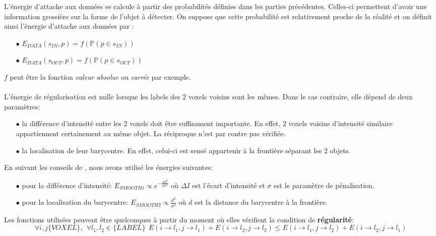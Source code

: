 \documentclass{article}
\begin{document}
L'énergie d'attache aux données se calcule à partir des probabilités définies dans les parties précédentes. Celles-ci permettent d'avoir une information grossière sur la forme de l'objet à détecter. On suppose que cette probabilité est relativement proche de la réalité et on définit ainsi l'énergie d'attache aux données par :
\begin{center}
\begin{itemize}
	\item[$\bullet$] $E_{DATA}(s_{IN}, p) = f(\mathbb{P}(p \in s_{IN}))$
	\item[$\bullet$] $E_{DATA}(s_{OUT}, p) =f( \mathbb{P}(p \in s_{OUT}))$
\end{itemize}
\end{center}
$f$ peut être la fonction \textit{valeur absolue} ou \textit{carrée} par exemple.
\\
\\
L'énergie de régularisation est nulle lorsque les labels des 2 voxels voisins sont les mêmes. Dans le cas contraire, elle dépend de deux paramètres:
\begin{itemize}
	\item[$\bullet$] la différence d'intensité entre les 2 voxels doit être suffisament importante. En effet, 2 voxels voisins d'intensité similaire appartiennent certainement au même objet. La réciproque n'est par contre pas vérifiée.
	\item[$\bullet$] la localisation de leur barycentre. En effet, celui-ci est sensé appartenir à la frontière séparant les 2 objets.
\end{itemize}
En suivant les conseils de \cite{bib:seg}, nous avons utilisé les énergies suivantes:
\begin{itemize}
	\item[$\bullet$] pour la différence d'intensité: $E_{SMOOTH 1} \varpropto e^{-\frac{\Delta I^2}{2\sigma^2}}$ où $\Delta I$ est l'écart d'intensité et $\sigma$ est le paramètre de pénalisation.
	\item[$\bullet$] pour la localisation du barycentre: $E_{SMOOTH 2} \varpropto  \frac{d^2}{\sigma^2}$ où $d$ est la distance du barycentre à la frontière.
\end{itemize}
Les fonctions utilisées peuvent être quelconques à partir du moment où elles vérifient la condition de \textbf{régularité}:
\begin{equation*}
\forall i, j \{VOXEL\}, \ \ \forall l_1, l_2 \in \{LABEL\}\ \  E(i\rightarrow l_1, j\rightarrow l_1) + E(i\rightarrow l_2, j\rightarrow l_2) \leq E(i\rightarrow l_1, j\rightarrow l_2) + E(i\rightarrow l_2, j\rightarrow l_1)
\end{equation*}
\end{document}
